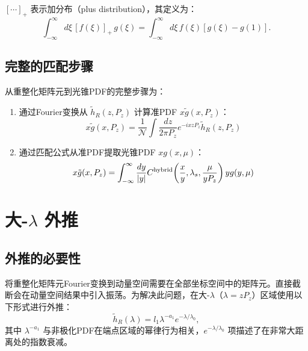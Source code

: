 \documentclass[11pt,a4paper]{article}
\newcommand{\hR}{\tilde{h}_R}
\newcommand{\Pz}{P_z}
\begin{document}
$[\cdots]_+$ 表示加分布（plus distribution），其定义为：
\begin{equation}
    \int_{-\infty}^{\infty} d\xi \, [f(\xi)]_+ \, g(\xi) = \int_{-\infty}^{\infty} d\xi \, f(\xi) [g(\xi) - g(1)].
\end{equation}

\subsection{完整的匹配步骤}

从重整化矩阵元到光锥PDF的完整步骤为：
\begin{enumerate}
    \item 通过Fourier变换从 $\hR(z, \Pz)$ 计算准PDF $x\tilde{g}(x, \Pz)$：
    \begin{equation}
        x\tilde{g}(x, \Pz) = \frac{1}{\mathcal{N}} \int \frac{dz}{2\pi\Pz} e^{-ixz\Pz} \hR(z, \Pz)
    \end{equation}
    \item 通过匹配公式从准PDF提取光锥PDF $x g(x, \mu)$：
    \begin{equation}
        x\tilde{g}(x, \Pz) = \int_{-\infty}^{\infty} \frac{dy}{|y|} C^{\text{hybrid}}\qty(\frac{x}{y}, \lambda_s, \frac{\mu}{y\Pz}) \, y g(y, \mu)
    \end{equation}
\end{enumerate}

\section{大-$\lambda$ 外推}

\subsection{外推的必要性}

将重整化矩阵元Fourier变换到动量空间需要在全部坐标空间中的矩阵元。直接截断会在动量空间结果中引入振荡。为解决此问题，在大-$\lambda$（$\lambda = z\Pz$）区域使用以下形式进行外推\cite{Ji:2020brr}：
\begin{equation}\label{eq:lambda_extrap}
    \hR(\lambda) = l_1 \lambda^{-a_1} e^{-\lambda/\lambda_0},
\end{equation}
其中 $\lambda^{-a_1}$ 与非极化PDF在端点区域的幂律行为相关，$e^{-\lambda/\lambda_0}$ 项描述了在非常大距离处的指数衰减。
\end{document}

